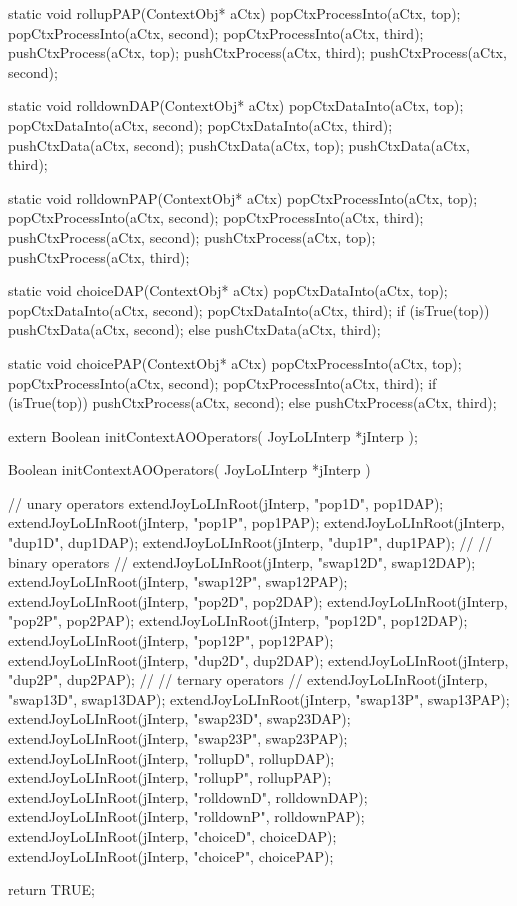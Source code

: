 \startCCode
static void rollupPAP(ContextObj* aCtx) {
  popCtxProcessInto(aCtx, top);
  popCtxProcessInto(aCtx, second);
  popCtxProcessInto(aCtx, third);
  pushCtxProcess(aCtx, top);
  pushCtxProcess(aCtx, third);
  pushCtxProcess(aCtx, second);
}
\stopCCode

\startCCode
static void rolldownDAP(ContextObj* aCtx) {
  popCtxDataInto(aCtx, top);
  popCtxDataInto(aCtx, second);
  popCtxDataInto(aCtx, third);
  pushCtxData(aCtx, second);
  pushCtxData(aCtx, top);
  pushCtxData(aCtx, third);
}
\stopCCode

\startCCode
static void rolldownPAP(ContextObj* aCtx) {
  popCtxProcessInto(aCtx, top);
  popCtxProcessInto(aCtx, second);
  popCtxProcessInto(aCtx, third);
  pushCtxProcess(aCtx, second);
  pushCtxProcess(aCtx, top);
  pushCtxProcess(aCtx, third);
}
\stopCCode

\startCCode
static void choiceDAP(ContextObj* aCtx) {
  popCtxDataInto(aCtx, top);
  popCtxDataInto(aCtx, second);
  popCtxDataInto(aCtx, third);
  if (isTrue(top)) {
    pushCtxData(aCtx, second);
  } else {
    pushCtxData(aCtx, third);
  }
}
\stopCCode

\startCCode
static void choicePAP(ContextObj* aCtx) {
  popCtxProcessInto(aCtx, top);
  popCtxProcessInto(aCtx, second);
  popCtxProcessInto(aCtx, third);
  if (isTrue(top)) {
    pushCtxProcess(aCtx, second);
  } else {
    pushCtxProcess(aCtx, third);
  }
}
\stopCCode


\startCHeader
extern Boolean initContextAOOperators(
  JoyLoLInterp *jInterp
);
\stopCHeader
{}

\startCCode
Boolean initContextAOOperators(
  JoyLoLInterp *jInterp
) {
  // unary operators
  extendJoyLoLInRoot(jInterp, "pop1D", pop1DAP);
  extendJoyLoLInRoot(jInterp, "pop1P", pop1PAP);
  extendJoyLoLInRoot(jInterp, "dup1D", dup1DAP);
  extendJoyLoLInRoot(jInterp, "dup1P", dup1PAP);
  //
  // binary operators
  //
  extendJoyLoLInRoot(jInterp, "swap12D", swap12DAP);
  extendJoyLoLInRoot(jInterp, "swap12P", swap12PAP);
  extendJoyLoLInRoot(jInterp, "pop2D",   pop2DAP);
  extendJoyLoLInRoot(jInterp, "pop2P",   pop2PAP);
  extendJoyLoLInRoot(jInterp, "pop12D",  pop12DAP);
  extendJoyLoLInRoot(jInterp, "pop12P",  pop12PAP);
  extendJoyLoLInRoot(jInterp, "dup2D",   dup2DAP);
  extendJoyLoLInRoot(jInterp, "dup2P",   dup2PAP);
  //
  // ternary operators
  //
  extendJoyLoLInRoot(jInterp, "swap13D",   swap13DAP);
  extendJoyLoLInRoot(jInterp, "swap13P",   swap13PAP);
  extendJoyLoLInRoot(jInterp, "swap23D",   swap23DAP);
  extendJoyLoLInRoot(jInterp, "swap23P",   swap23PAP);
  extendJoyLoLInRoot(jInterp, "rollupD",   rollupDAP);
  extendJoyLoLInRoot(jInterp, "rollupP",   rollupPAP);
  extendJoyLoLInRoot(jInterp, "rolldownD", rolldownDAP);
  extendJoyLoLInRoot(jInterp, "rolldownP", rolldownPAP);
  extendJoyLoLInRoot(jInterp, "choiceD",   choiceDAP);
  extendJoyLoLInRoot(jInterp, "choiceP",   choicePAP);
  
  return TRUE;
}
\stopCCode
